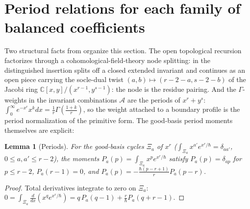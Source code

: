 \documentclass[11pt]{amsart}
\newtheorem{lemma}[theorem]{Lemma}
\theoremstyle{definition}
\theoremstyle{remark}
\newcommand{\CC}{\mathbb{C}}
\newcommand{\Ascr}{\mathcal{A}}
\begin{document}
\section{Period relations for each family of balanced coefficients}
\label{sec:diagonal}

Two structural facts from \cite{GKT} organize this section. The open
topological recursion factorizes through a
cohomological-field-theory node splitting: in
\cite[Lem.~6.4]{GKT} the distinguished insertion splits off a closed extended
invariant and continues as an open piece carrying the socle-dual twist
$(a,b)\mapsto(r{-}2{-}a,s{-}2{-}b)$ of the Jacobi ring
$\CC[x,y]/(x^{r-1},y^{s-1})$: the node is the residue pairing. And the
$\Gamma$-weights in the invariant combinations $\Ascr$ are the periods of
$x^{r}+y^{s}$: $\int_{0}^{\infty}e^{-x^{r}}x^{k}dx=\tfrac1r\Gamma(\tfrac{1+k}r)$,
so the weight attached to a boundary profile is the period normalization of the
primitive form. The good-basis period moments themselves are explicit:

\begin{lemma}[Periods]
\label{lem:periods}
For the good-basis cycles $\Xi_{a}$ of $x^{r}$
($\int_{\Xi_{a}}x^{a'}e^{x^{r}/\hbar}=\delta_{aa'}$, $0\le a,a'\le r-2$), the
moments $P_{a}(p)=\int_{\Xi_{a}}x^{p}e^{x^{r}/\hbar}$ satisfy
$P_{a}(p)=\delta_{ap}$ for $p\le r{-}2$, $P_{a}(r{-}1)=0$, and
$P_{a}(p)=-\tfrac{\hbar(p-r+1)}{r}P_{a}(p-r)$.
\end{lemma}

\begin{proof}
Total derivatives integrate to zero on $\Xi_{a}$:
$0=\int_{\Xi_{a}}\tfrac{d}{dx}(x^{q}e^{x^{r}/\hbar})
=q\,P_{a}(q{-}1)+\tfrac r\hbar P_{a}(q{+}r{-}1)$.
\end{proof}
\end{document}
